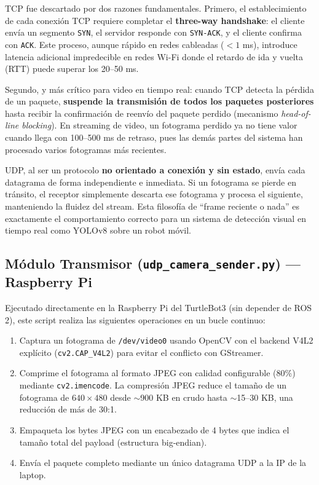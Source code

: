 \documentclass[12pt,a4paper]{article}
\begin{document}
TCP fue descartado por dos razones fundamentales. Primero, el establecimiento de cada conexi\'on TCP requiere completar el \textbf{three-way handshake}: el cliente env\'ia un segmento \texttt{SYN}, el servidor responde con \texttt{SYN-ACK}, y el cliente confirma con \texttt{ACK}. Este proceso, aunque r\'apido en redes cableadas ($<1$ ms), introduce latencia adicional impredecible en redes Wi-Fi donde el retardo de ida y vuelta (RTT) puede superar los 20--50 ms.

Segundo, y m\'as cr\'itico para video en tiempo real: cuando TCP detecta la p\'erdida de un paquete, \textbf{suspende la transmisi\'on de todos los paquetes posteriores} hasta recibir la confirmaci\'on de reenv\'io del paquete perdido (mecanismo \textit{head-of-line blocking}). En streaming de video, un fotograma perdido ya no tiene valor cuando llega con 100--500 ms de retraso, pues las dem\'as partes del sistema han procesado varios fotogramas m\'as recientes.

UDP, al ser un protocolo \textbf{no orientado a conexi\'on y sin estado}, env\'ia cada datagrama de forma independiente e inmediata. Si un fotograma se pierde en tr\'ansito, el receptor simplemente descarta ese fotograma y procesa el siguiente, manteniendo la fluidez del stream. Esta filosof\'ia de ``frame reciente o nada'' es exactamente el comportamiento correcto para un sistema de detecci\'on visual en tiempo real como YOLOv8 sobre un robot m\'ovil.

\subsection{M\'odulo Transmisor (\texttt{udp\_camera\_sender.py}) --- Raspberry Pi}

Ejecutado directamente en la Raspberry Pi del TurtleBot3 (sin depender de ROS 2), este script realiza las siguientes operaciones en un bucle continuo:

\begin{enumerate}
    \item Captura un fotograma de \texttt{/dev/video0} usando OpenCV con el backend V4L2 expl\'icito (\texttt{cv2.CAP\_V4L2}) para evitar el conflicto con GStreamer.
    \item Comprime el fotograma al formato JPEG con calidad configurable (80\%) mediante \texttt{cv2.imencode}. La compresi\'on JPEG reduce el tama\~no de un fotograma de $640\times480$ desde $\sim$900 KB en crudo hasta $\sim$15--30 KB, una reducci\'on de m\'as de 30:1.
    \item Empaqueta los bytes JPEG con un encabezado de 4 bytes que indica el tama\~no total del payload (estructura big-endian).
    \item Env\'ia el paquete completo mediante un \'unico datagrama UDP a la IP de la laptop.
\end{enumerate}
\end{document}

